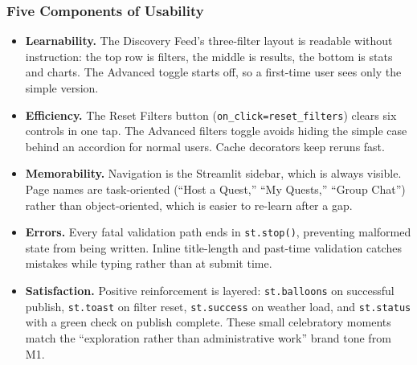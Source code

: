 \documentclass[11pt]{article}
\begin{document}
\subsubsection{Five Components of Usability}

\begin{itemize}
    \item \textbf{Learnability.} The Discovery Feed's three-filter layout is readable without instruction: the top row is filters, the middle is results, the bottom is stats and charts. The Advanced toggle starts off, so a first-time user sees only the simple version.
    \item \textbf{Efficiency.} The Reset Filters button (\texttt{on\_click=reset\_filters}) clears six controls in one tap. The Advanced filters toggle avoids hiding the simple case behind an accordion for normal users. Cache decorators keep reruns fast.
    \item \textbf{Memorability.} Navigation is the Streamlit sidebar, which is always visible. Page names are task-oriented (``Host a Quest,'' ``My Quests,'' ``Group Chat'') rather than object-oriented, which is easier to re-learn after a gap.
    \item \textbf{Errors.} Every fatal validation path ends in \texttt{st.stop()}, preventing malformed state from being written. Inline title-length and past-time validation catches mistakes while typing rather than at submit time.
    \item \textbf{Satisfaction.} Positive reinforcement is layered: \texttt{st.balloons} on successful publish, \texttt{st.toast} on filter reset, \texttt{st.success} on weather load, and \texttt{st.status} with a green check on publish complete. These small celebratory moments match the ``exploration rather than administrative work'' brand tone from M1.
\end{itemize}
\end{document}
